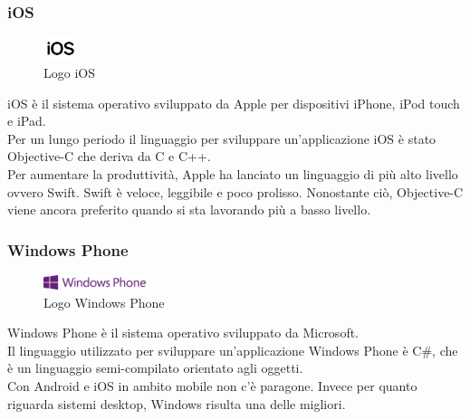  \subsubsection{iOS}
 \begin{figure}[htbp]	
 	\centering
 	\includegraphics[width=1cm]{immagini/logoios.jpg}
 	\caption{Logo iOS}
 	\label{fig:Logo iOS}
 \end{figure}
 iOS è il sistema operativo sviluppato da Apple per dispositivi iPhone, iPod touch e iPad.\\
 Per un lungo periodo il linguaggio per sviluppare un'applicazione iOS è stato Objective-C che deriva da C e C++. \\
 Per aumentare la produttività, Apple ha lanciato un linguaggio di più alto livello ovvero Swift. Swift è veloce, leggibile e poco prolisso. Nonostante ciò, Objective-C viene ancora preferito quando si sta lavorando più a basso livello.\\

 \subsubsection{Windows Phone}
 \begin{figure}[htbp]	
 	\centering
 	\includegraphics[width=3cm]{immagini/logowindowsphone.png}
 	\caption{Logo Windows Phone}
 	\label{fig:Logo Windows Phone}
 \end{figure}
Windows Phone è il sistema operativo sviluppato da Microsoft.\\
Il linguaggio utilizzato per sviluppare un'applicazione Windows Phone è C\#, che è un linguaggio semi-compilato orientato agli oggetti.\\
Con Android e iOS in ambito mobile non c'è paragone. Invece per quanto riguarda sistemi desktop, Windows risulta una delle migliori.\\
 
